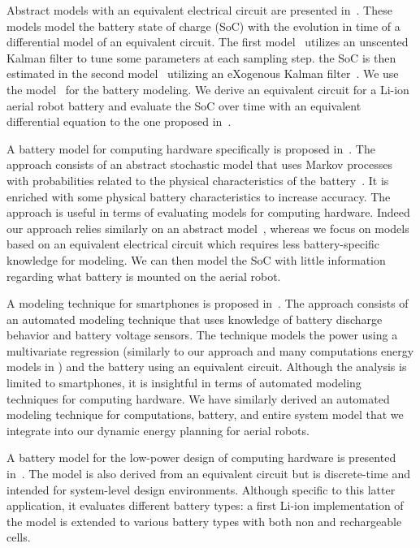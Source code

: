 Abstract models with an equivalent electrical circuit are presented in~\citep{xing2014state,hasan2018exogenous}. These models model the battery state of charge (SoC) with the evolution in time of a differential model of an equivalent circuit. The first model~\citep{xing2014state} utilizes an unscented Kalman filter to tune some parameters at each sampling step. the SoC is then estimated in the second model~\citep{hasan2018exogenous} utilizing an eXogenous Kalman filter~\citep{johansen2017exogenous}. We use the model~\citep{hasan2018exogenous} for the battery modeling. We derive an equivalent circuit for a Li-ion aerial robot battery and evaluate the SoC over time with an equivalent differential equation to the one proposed in~\citep{hasan2018exogenous}. 

A battery model for computing hardware specifically is proposed in~\citep{rao2005battery}. The approach consists of an abstract stochastic model that uses Markov processes with probabilities related to the physical characteristics of the battery~\citep{panigrahi2001battery}. It is enriched with some physical battery characteristics to increase accuracy. The approach is useful in terms of evaluating models for computing hardware. Indeed our approach relies similarly on an abstract model~\citep{hasan2018exogenous}, whereas we focus on models based on an equivalent electrical circuit which requires less battery-specific knowledge for modeling. We can then model the SoC with little information regarding what battery is mounted on the aerial robot. 

A modeling technique for smartphones is proposed in~\citep{zhang2010accurate}. The approach consists of an automated modeling technique that uses knowledge of battery discharge behavior and battery voltage sensors. The technique models the power using a multivariate regression (similarly to our approach and many computations energy models in ) and the battery using an equivalent circuit. Although the analysis is limited to smartphones, it is insightful in terms of automated modeling techniques for computing hardware. We have similarly derived an automated modeling technique for computations, battery, and entire system model that we integrate into our dynamic energy planning for aerial robots.

A battery model for the low-power design of computing hardware is presented in~\citep{benini2001discrete}. The model is also derived from an equivalent circuit but is discrete-time and intended for system-level design environments. Although specific to this latter application, it evaluates different battery types: a first Li-ion implementation of the model is extended to various battery types with both non and rechargeable cells. 




